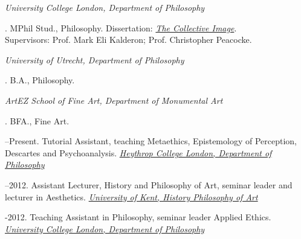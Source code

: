 \documentclass[11pt]{article}
\begin{document}
\noindent\emph{University College London, Department of  Philosophy \vspace{0.01in}}


. MPhil Stud., Philosophy. Dissertation: \href{http://discovery.ucl.ac.uk/1348204/}{\emph{The Collective Image}}.\\ Supervisors: Prof. Mark Eli Kalderon; Prof. Christopher Peacocke. \vspace{-0.1in}

\bigskip

\noindent\emph{University of Utrecht, Department of  Philosophy\vspace{0.02in}}

. B.A., Philosophy.

\medskip

\noindent\emph{ArtEZ School of Fine Art, Department of Monumental Art\vspace{0.02in}}

. BFA., Fine Art.

\bigskip

\bigskip






--Present. Tutorial Assistant, teaching Metaethics, Epistemology of Perception, Descartes and Psychoanalysis. \href{http://www.heythrop.ac.uk/departments/academic-departments/philosophy/}{\emph{Heythrop College London, Department of  Philosophy} \vspace{0.01in}}

\medskip

--2012. Assistant Lecturer, History and Philosophy of Art, seminar leader and lecturer in Aesthetics. \href{http://www.kent.ac.uk/arts/hpa/index.html}{\emph{University of Kent, History \amper Philosophy of Art} \vspace{0.01in}}

\medskip

-2012. Teaching Assistant in Philosophy, seminar leader Applied Ethics. \href{http://www.ucl.ac.uk/philosophy/}{\emph{University College London, Department of  Philosophy}} \vspace{0.01in}

% 
% 
% 
% 
% 
\end{document}
